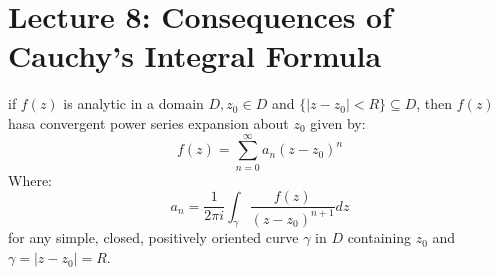 \chapter{Lecture 8: Consequences of Cauchy's Integral Formula}

\begin{theorem}
    if $f(z)$ is analytic in a domain $D, z_0 \in D$ and $\{|z-z_0| < R\} \subseteq D$, then $f(z)$ hasa convergent power series expansion about $z_0$ given by:
    \begin{equation}
        f(z) = \sum_{n=0}^{\infty} a_n(z-z_0)^n
    \end{equation}
    Where:
    \begin{equation}
        a_n = \frac{1}{2\pi i} \int_{\gamma} \frac{f(z)}{(z-z_0)^{n+1}} dz
    \end{equation}
    for any simple, closed, positively oriented curve $\gamma$ in $D$ containing $z_0$ and $\gamma=|z-z_0| = R$.
\end{theorem}

